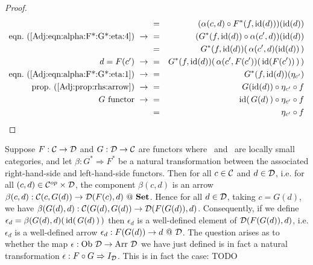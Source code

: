 \begin{proof}
\begin{eqnarray*}
            &=&(\alpha(c,d)\circ F^{*}(f,\id(d)))(\id(d))\\
            \mbox{eqn.~(\ref{Adj:eqn:alpha:F*:G*:eta:4})}\ \to\ 
            &=&(G^{*}(f,\id(d))\circ\alpha(c',d))(\id(d))\\
            &=&G^{*}(f,\id(d))(\,\alpha(c',d)(\id(d))\,)\\
            \mbox{$d=F(c')$}\ \to\ 
            &=&G^{*}(f,\id(d))(\,\alpha(c',F(c'))(\,\id(F(c'))\,)\,)\\
            \mbox{eqn.~(\ref{Adj:eqn:alpha:F*:G*:eta:1})}\ \to\ 
            &=&G^{*}(f,\id(d))(\eta_{c'})\\
            \mbox{prop.~(\ref{Adj:prop:rhs:arrow})}\ \to\ 
            &=&G(\id(d))\circ\eta_{c'}\circ f\\
            \mbox{$G$ functor}\ \to\ 
            &=&\id(\,G(d)\,)\circ\eta_{c'}\circ f\\
            &=&\eta_{c'}\circ f\\
        \end{eqnarray*}
\end{proof}

Suppose $F:\mbox{$\cal C$}\to\mbox{$\cal D$}$ and $G:\mbox{$\cal D$}\to\mbox{$\cal C$}$ are functors where \Cat\ and \Dat\ 
are locally small categories, and let $\beta:G^{*}\Rightarrow F^{*}$ be a 
natural transformation between the associated right-hand-side and left-hand-side
functors. Then for all $c\in\mbox{$\cal C$}$ and $d\in\mbox{$\cal D$}$, i.e. for all $(c,d)\in
\mbox{${\cal C}^{op}$}\times\mbox{$\cal D$}$, the component $\beta(c,d)$ is an arrow
$\beta(c,d):\Cat(c,G(d))\to\Dat(F(c),d)\ @\ \Set$. Hence for all $d\in\mbox{$\cal D$}$,
taking $c=G(d)$, we have $\beta(G(d),d):\mbox{$\cal C$}(G(d),G(d))\to\mbox{$\cal D$}(F(G(d)),d)$.
Consequently, if we define $\epsilon_{d}=\beta(G(d),d)(\,\mbox{\rm id}(\,G(d)\,)\,)$ then
$\epsilon_{d}$ is a well-defined element of $\mbox{$\cal D$}(F(G(d)),d)$, i.e.
$\epsilon_{d}$ is a well-defined arrow $\epsilon_{d}:F(G(d))\to d\ @\ \mbox{$\cal D$}$. The question
arises as to whether the map $\epsilon:\mbox{\rm Ob}\ \mbox{$\cal D$}\to\mbox{\rm Arr}\ \mbox{$\cal D$}$ we have just defined
is in fact a natural transformation $\epsilon:F\circ G\Rightarrow I_{\cal D}$.
This is in fact the case:
TODO

